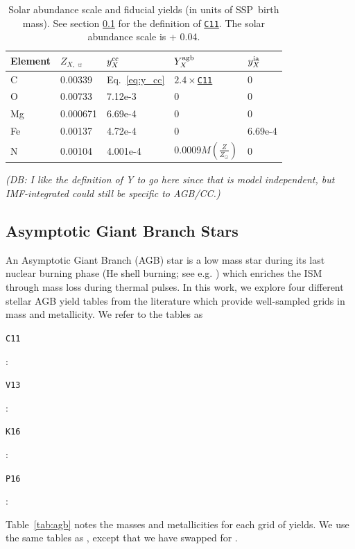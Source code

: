 \documentclass[fleqn,
usenatbib]{mnras}
\newcommand{\cxi}{\texttt{\hyperlink{C11}{C11}}}
\newcommand{\cfactor}{2.4}
\newcommand{\y}{Y}
\newcommand{\dbnote}[1]{{\color{Thistle} \textit{\small (DB: #1)}}}
\begin{document}
\begin{table}
	\centering
    \caption[]{Solar abundance scale and fiducial yields (in units of SSP~birth mass). See section \ref{sec:agb} for the definition of \cxi. The solar abundance scale is \citet{magg+22} + 0.04. }
	\label{tab:fiducial_mod}

	\begin{tabular}{l l l l l}
		\hline
        Element & $Z_{X,\,\sun}$ & $y_X^{\rm cc}$ & $\y_X^{\rm agb}$ & $y_X^{\rm ia}$  \\
		\hline
        C & 0.00339 & Eq.~\ref{eq:y_cc} & $\cfactor\times$\cxi &  0 \\
        O & 0.00733 & 7.12e-3 & 0 & 0 \\
        Mg & 0.000671 & 6.69e-4 & 0 & 0 \\
        Fe & 0.00137 & 4.72e-4 & 0 & 6.69e-4 \\
        N &0.00104 & 4.001e-4 & 0.0009$M\left(\frac{Z}{Z_\odot}\right)$ & 0\\
		\hline
	\end{tabular}
\end{table}


\dbnote{I like the definition of Y to go here since that is model independent, but IMF-integrated could still be specific to AGB/CC.}


\subsection{Asymptotic Giant Branch Stars}\label{sec:agb}

An Asymptotic Giant Branch (AGB) star is a low mass star during its last nuclear burning phase (He shell burning; see e.g. \citealt{PR2023}) which enriches the ISM through mass loss during thermal pulses.
    In this work, we explore four different stellar AGB yield tables from the literature which provide
    well-sampled grids in mass and metallicity. We refer to the tables as 
\begin{description}
    \item \hypertarget{C11}{\texttt{C11}}: \citet{cristallo+11, cristallo+15}
    \item \hypertarget{V13}{\texttt{V13}}: \citet{ventura+13,ventura+14,ventura+18, ventura+20}
    \item \hypertarget{K16}{\texttt{K16}}: \citet{KL16, karakas+18}
    \item \hypertarget{P16}{\texttt{P16}}: \citet{pignatari+16, ritter+18, battino+19, battino+21}
\end{description}
Table~\ref{tab:agb} notes the masses and metallicities for each grid of yields.
We use the same tables as \citet{james+23}, except that we have swapped \citet{karakas10} for \citet{ritter+18}. 
\end{document}
